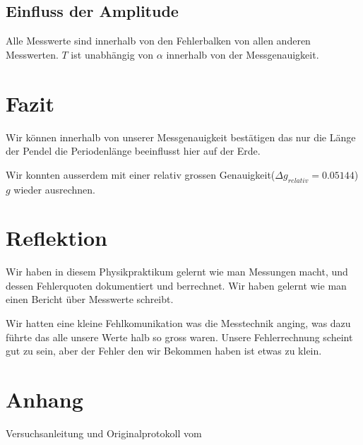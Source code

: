 \documentclass[12pt, a4paper, twoside]{article}
\begin{document}
\subsection{Einfluss der Amplitude}
\begin{center}
\end{center}

Alle Messwerte sind innerhalb von den Fehlerbalken von allen anderen Messwerten.
$T$ ist unabhängig von $\alpha$ innerhalb von der Messgenauigkeit.
\section{Fazit}
Wir können innerhalb von unserer Messgenauigkeit bestätigen das nur die Länge der Pendel die Periodenlänge beeinflusst hier auf der Erde.
\par
Wir konnten ausserdem mit einer relativ grossen Genauigkeit($\Delta g_{relativ} = 0.05144$) $g$ wieder ausrechnen.


\section{Reflektion}
Wir haben in diesem Physikpraktikum gelernt wie man Messungen macht, und dessen Fehlerquoten dokumentiert und berrechnet.
Wir haben gelernt wie man einen Bericht über Messwerte schreibt.

Wir hatten eine kleine Fehlkomunikation was die Messtechnik anging, was dazu führte das alle unsere Werte halb so gross waren.
Unsere Fehlerrechnung scheint gut zu sein, aber der Fehler den wir Bekommen haben ist etwas zu klein.
\section{Anhang}
Versuchsanleitung und Originalprotokoll vom \labdate
\end{document}
